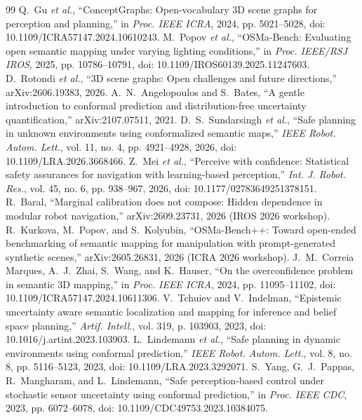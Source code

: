 \documentclass[conference]{IEEEtran}
\theoremstyle{definition}
\begin{document}
\begin{thebibliography}{99}
\footnotesize
{} Q.~Gu \emph{et al.}, ``ConceptGraphs: Open-vocabulary 3D scene graphs for perception and planning,'' in \emph{Proc. IEEE ICRA}, 2024, pp. 5021--5028, doi: 10.1109/ICRA57147.2024.10610243.
 M.~Popov \emph{et al.}, ``OSMa-Bench: Evaluating open semantic mapping under varying lighting conditions,'' in \emph{Proc. IEEE/RSJ IROS}, 2025, pp. 10786--10791, doi: 10.1109/IROS60139.2025.11247603.
 D.~Rotondi \emph{et al.}, ``3D scene graphs: Open challenges and future directions,'' arXiv:2606.19383, 2026.
 A.~N.~Angelopoulos and S.~Bates, ``A gentle introduction to conformal prediction and distribution-free uncertainty quantification,'' arXiv:2107.07511, 2021.
 D.~S.~Sundarsingh \emph{et al.}, ``Safe planning in unknown environments using conformalized semantic maps,'' \emph{IEEE Robot. Autom. Lett.}, vol. 11, no. 4, pp. 4921--4928, 2026, doi: 10.1109/LRA.2026.3668466.
 Z.~Mei \emph{et al.}, ``Perceive with confidence: Statistical safety assurances for navigation with learning-based perception,'' \emph{Int. J. Robot. Res.}, vol. 45, no. 6, pp. 938--967, 2026, doi: 10.1177/02783649251378151.
 R.~Baral, ``Marginal calibration does not compose: Hidden dependence in modular robot navigation,'' arXiv:2609.23731, 2026 (IROS 2026 workshop).
 R.~Kurkova, M.~Popov, and S.~Kolyubin, ``OSMa-Bench++: Toward open-ended benchmarking of semantic mapping for manipulation with prompt-generated synthetic scenes,'' arXiv:2605.26831, 2026 (ICRA 2026 workshop).
 J.~M.~Correia Marques, A.~J.~Zhai, S.~Wang, and K.~Hauser, ``On the overconfidence problem in semantic 3D mapping,'' in \emph{Proc. IEEE ICRA}, 2024, pp. 11095--11102, doi: 10.1109/ICRA57147.2024.10611306.
 V.~Tchuiev and V.~Indelman, ``Epistemic uncertainty aware semantic localization and mapping for inference and belief space planning,'' \emph{Artif. Intell.}, vol. 319, p. 103903, 2023, doi: 10.1016/j.artint.2023.103903.
 L.~Lindemann \emph{et al.}, ``Safe planning in dynamic environments using conformal prediction,'' \emph{IEEE Robot. Autom. Lett.}, vol. 8, no. 8, pp. 5116--5123, 2023, doi: 10.1109/LRA.2023.3292071.
 S.~Yang, G.~J.~Pappas, R.~Mangharam, and L.~Lindemann, ``Safe perception-based control under stochastic sensor uncertainty using conformal prediction,'' in \emph{Proc. IEEE CDC}, 2023, pp. 6072--6078, doi: 10.1109/CDC49753.2023.10384075.

\end{thebibliography}
\end{document}
